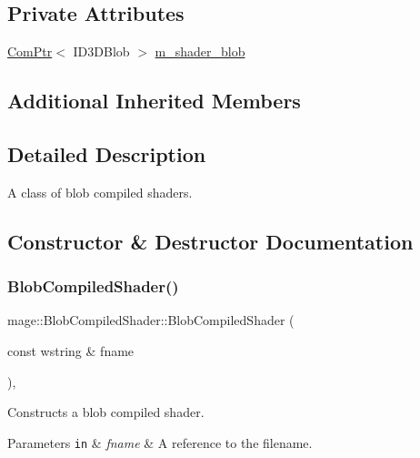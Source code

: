 \subsection*{Private Attributes}
\begin{DoxyCompactItemize}
\item 
\hyperlink{namespacemage_ae74f374780900893caa5555d1031fd79}{Com\+Ptr}$<$ I\+D3\+D\+Blob $>$ \hyperlink{classmage_1_1_blob_compiled_shader_a1a6959678592e3456ac8cb810dbdf648}{m\+\_\+shader\+\_\+blob}
\end{DoxyCompactItemize}
\subsection*{Additional Inherited Members}


\subsection{Detailed Description}
A class of blob compiled shaders. 

\subsection{Constructor \& Destructor Documentation}
\hypertarget{classmage_1_1_blob_compiled_shader_adc5b712c668912296a634bffb3a31e68}{}\label{classmage_1_1_blob_compiled_shader_adc5b712c668912296a634bffb3a31e68} 
\subsubsection{\texorpdfstring{Blob\+Compiled\+Shader()}{BlobCompiledShader()}\hspace{0.1cm}{\footnotesize\ttfamily [1/3]}}
{\footnotesize\ttfamily mage\+::\+Blob\+Compiled\+Shader\+::\+Blob\+Compiled\+Shader (\begin{DoxyParamCaption}\item[{const wstring \&}]{fname }\end{DoxyParamCaption})\hspace{0.3cm}{\ttfamily [explicit]}, {\ttfamily [noexcept]}}

Constructs a blob compiled shader.


\begin{DoxyParams}[1]{Parameters}
\mbox{\tt in}  & {\em fname} & A reference to the filename. \\
\hline
\end{DoxyParams}

